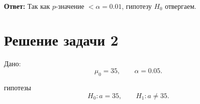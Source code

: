 \documentclass[a4paper,14pt]{extarticle}
\begin{document}
\textbf{Ответ:} Так как \(p\)-значение \(< \alpha = 0.01\), гипотезу \(H_0\) отвергаем.


\section{Решение задачи 2}

Дано:
\[
\mu_0=35,\qquad \alpha=0.05.
\]

 гипотезы
\[
H_0:a=35,
\qquad
H_1:a\neq 35.
\]











\end{document}
